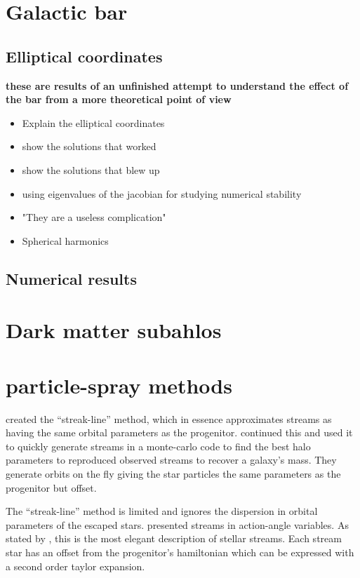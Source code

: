 \section{Galactic bar}
    \subsection{Elliptical coordinates}
        \textbf{these are results of an unfinished attempt to understand the effect of the bar from a more theoretical point of view}
        \begin{itemize}
            \item Explain the elliptical coordinates 
            \item show the solutions that worked
            \item show the solutions that blew up 
            \item using eigenvalues of the jacobian for studying numerical stability 
            \item "They are a useless complication"
            \item Spherical harmonics 
        \end{itemize}

    \subsection{Numerical results}

\section{Dark matter subahlos}


\section{particle-spray methods}

\citet{2012MNRAS.420.2700K} created the ``streak-line'' method, which in essence approximates streams as having the same orbital parameters as the progenitor. \citet{2014ApJ...795...94B} continued this and used it to quickly generate streams in a monte-carlo code to find the best halo parameters to reproduced observed streams to recover a galaxy's mass. They generate orbits on the fly giving the star particles the same parameters as the progenitor but offset. 

The ``streak-line'' method is limited and ignores the dispersion in orbital parameters of the escaped stars. \citet{2011MNRAS.413.1852E} presented streams in action-angle variables. As stated by \citet{2015MNRAS.452..301F}, this is the most elegant description of stellar streams. Each stream star has an offset from the progenitor's hamiltonian which can be expressed with a second order taylor expansion. 

